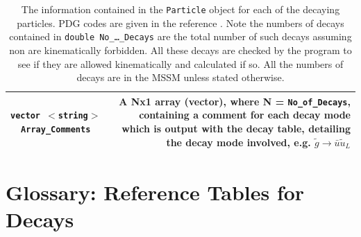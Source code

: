 \documentclass[final,3p,times]{elsarticle}
\begin{document}
\begin{center}
\begin{table}
\begin{tabular}{|C|D|}
{\tt vector $<$string$>$ Array{\_}Comments} & A Nx1 array (vector), where N = {\tt No{\_}of{\_}Decays}, containing a comment for each decay mode which is output with the decay table, detailing the decay mode involved, e.g. $\tilde{g} \rightarrow \bar{u} \tilde{u}_L$ \\ \hline
\end{tabular}
\caption{The information contained in the {\tt Particle} object for each of
  the decaying particles. PDG codes are given in the reference
  \cite{Allanach:2008qq}. Note the numbers of decays contained in {\tt double
    No{\_}\ldots{\_}Decays} are the total number of such decays assuming non are
  kinematically forbidden. All these decays are checked by the program to see
  if they are allowed kinematically and calculated if so. All the numbers of
  decays are in the MSSM unless stated otherwise.} 
\label{particleclass}
\end{table}
\end{center}

\section{Glossary: Reference Tables for Decays\label{appendix:exp}} 
\end{document}
